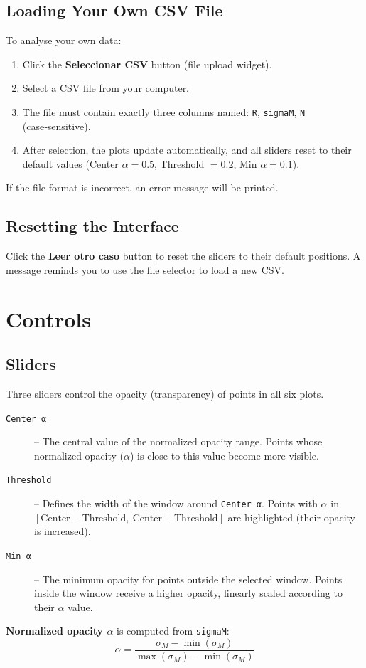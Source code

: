 \documentclass[12pt,a4paper]{article}
\begin{document}
\subsection{Loading Your Own CSV File}
To analyse your own data:
\begin{enumerate}
    \item Click the \textbf{Seleccionar CSV} button (file upload widget).
    \item Select a CSV file from your computer.
    \item The file must contain exactly three columns named: \texttt{R}, \texttt{sigmaM}, \texttt{N} (case‑sensitive).
    \item After selection, the plots update automatically, and all sliders reset to their default values (Center $\alpha=0.5$, Threshold $=0.2$, Min $\alpha=0.1$).
\end{enumerate}

\noindent If the file format is incorrect, an error message will be printed.

\subsection{Resetting the Interface}
Click the \textbf{Leer otro caso} button to reset the sliders to their default positions. A message reminds you to use the file selector to load a new CSV.

\section{Controls}
\subsection{Sliders}
Three sliders control the opacity (transparency) of points in all six plots.
\begin{description}
    \item[\texttt{Center α}] – The central value of the normalized opacity range. Points whose normalized opacity ($\alpha$) is close to this value become more visible.
    \item[\texttt{Threshold}] – Defines the width of the window around \texttt{Center α}. Points with $\alpha$ in $[\text{Center}-\text{Threshold},\ \text{Center}+\text{Threshold}]$ are highlighted (their opacity is increased).
    \item[\texttt{Min α}] – The minimum opacity for points outside the selected window. Points inside the window receive a higher opacity, linearly scaled according to their $\alpha$ value.
\end{description}
\noindent \textbf{Normalized opacity $\alpha$} is computed from \texttt{sigmaM}:
\[
\alpha = \frac{\sigma_M - \min(\sigma_M)}{\max(\sigma_M) - \min(\sigma_M)}
\]
\end{document}
